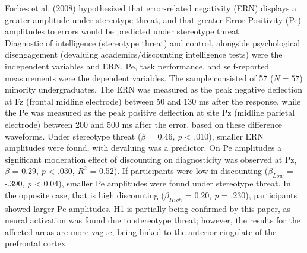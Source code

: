 \documentclass[
  stu, a4paper, 12pt,mask,floatsintext]{apa7}
\begin{document}
Forbes et al. (2008) hypothesized that error-related negativity (ERN) displays a greater amplitude under stereotype threat, and that greater Error Positivity (Pe) amplitudes to errors would be predicted under stereotype threat.\\
Diagnostic of intelligence (stereotype threat) and control, alongside psychological disengagement (devaluing academics/discounting intelligence tests) were the independent variables and ERN, Pe, task performance, and self-reported measurements were the dependent variables.
The sample consisted of 57 (\(N = 57\)) minority undergraduates.
The ERN was measured as the peak negative deflection at Fz (frontal midline electrode) between 50 and 130 ms after the response, while the Pe was measured as the peak positive deflection at site Pz (midline parietal electrode) between 200 and 500 ms after the error, based on these difference waveforms.
Under stereotype threat (\(\beta\) = 0.46, \emph{p} \textless{} .010), smaller ERN amplitudes were found, with devaluing was a predictor.
On Pe amplitudes a significant moderation effect of discounting on diagnosticity was observed at Pz, \(\beta\) = 0.29, \emph{p} \textless{} .030, \(R^2\) = 0.52).
If participants were low in discounting (\(\beta_{Low}\) = -.390, \emph{p} \textless{} 0.04), smaller Pe amplitudes were found under stereotype threat.
In the opposite case, that is high discounting (\(\beta_{High}\) = 0.20, \emph{p} = .230), participants showed larger Pe amplitudes.
H1 is partially being confirmed by this paper, as neural activation was found due to stereotype threat; however, the results for the affected areas are more vague, being linked to the anterior cingulate of the prefrontal cortex.
\end{document}
